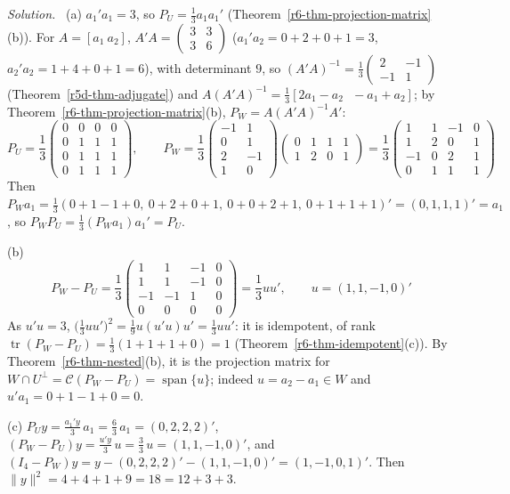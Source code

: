 \documentclass[12pt]{article}
\DeclareMathOperator{\tr}{tr}
\DeclareMathOperator{\Span}{span}
\theoremstyle{definition}
\newenvironment{solution}{\par\noindent\textit{Solution.}\ }{\par\smallskip}
\begin{document}
\begin{solution}
(a) \(a_1'a_1=3\), so \(P_U=\frac13a_1a_1'\) (Theorem~\ref{r6-thm-projection-matrix}(b)). For \(A=[a_1\ a_2]\),
\(A'A=\left(\begin{smallmatrix}3&3\\3&6\end{smallmatrix}\right)\) (\(a_1'a_2=0+2+0+1=3\), \(a_2'a_2=1+4+0+1=6\)),
with determinant \(9\), so \((A'A)^{-1}=\frac13\left(\begin{smallmatrix}2&-1\\-1&1\end{smallmatrix}\right)\)
(Theorem~\ref{r5d-thm-adjugate}) and \(A(A'A)^{-1}=\frac13[2a_1-a_2\ \ \ -a_1+a_2]\); by
Theorem~\ref{r6-thm-projection-matrix}(b), \(P_W=A(A'A)^{-1}A'\):
\[
P_U=\frac13\begin{pmatrix}0&0&0&0\\0&1&1&1\\0&1&1&1\\0&1&1&1\end{pmatrix},\qquad
P_W=\frac13\begin{pmatrix}-1&1\\0&1\\2&-1\\1&0\end{pmatrix}\begin{pmatrix}0&1&1&1\\1&2&0&1\end{pmatrix}
=\frac13\begin{pmatrix}1&1&-1&0\\1&2&0&1\\-1&0&2&1\\0&1&1&1\end{pmatrix}
\]
Then \(P_Wa_1=\frac13(0+1-1+0,\ 0+2+0+1,\ 0+0+2+1,\ 0+1+1+1)'=(0,1,1,1)'=a_1\), so
\(P_WP_U=\frac13(P_Wa_1)a_1'=P_U\).

(b)
\[
P_W-P_U=\frac13\begin{pmatrix}1&1&-1&0\\1&1&-1&0\\-1&-1&1&0\\0&0&0&0\end{pmatrix}=\frac13uu',\qquad u=(1,1,-1,0)'
\]
As \(u'u=3\), \(\bigl(\frac13uu'\bigr)^2=\frac19u(u'u)u'=\frac13uu'\): it is idempotent, of rank
\(\tr(P_W-P_U)=\frac13(1+1+1+0)=1\) (Theorem~\ref{r6-thm-idempotent}(c)). By Theorem~\ref{r6-thm-nested}(b), it
is the projection matrix for \(W\cap U^\perp=\mathcal C(P_W-P_U)=\Span\{u\}\); indeed \(u=a_2-a_1\in W\) and
\(u'a_1=0+1-1+0=0\).

(c) \(P_Uy=\frac{a_1'y}3\,a_1=\frac63\,a_1=(0,2,2,2)'\), \((P_W-P_U)y=\frac{u'y}3\,u=\frac33\,u=(1,1,-1,0)'\), and
\((I_4-P_W)y=y-(0,2,2,2)'-(1,1,-1,0)'=(1,-1,0,1)'\). Then
\(\lVert y\rVert^2=4+4+1+9=18=12+3+3\).
\end{solution}
\end{document}
